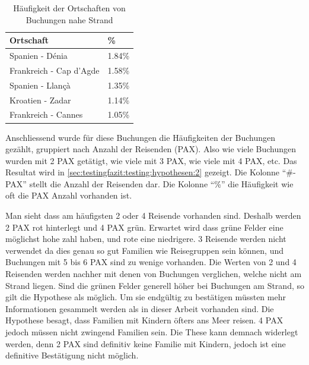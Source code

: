 \begin{table}[H] 
	\caption{Häufigkeit der Ortschaften von Buchungen nahe Strand}
	\centering
	\label{sec:testingfazit:testing:hypothesen:1}
	\begin{tabular}{ | l | l | } 
		\hline 
		\rowcolor{tableheadcolor}
		\bfseries Ortschaft & \bfseries \% \\ \hline 
		Spanien - Dénia & 1.84\% \\ \hline 
		Frankreich - Cap d'Agde & 1.58\% \\ \hline 
		Spanien - Llançà & 1.35\% \\ \hline 
		Kroatien - Zadar & 1.14\% \\ \hline 
		Frankreich - Cannes & 1.05\% \\ \hline 
	\end{tabular}
\end{table}

Anschliessend wurde für diese Buchungen die Häufigkeiten der Buchungen gezählt, gruppiert nach Anzahl der Reisenden (PAX). Also wie viele Buchungen wurden mit 2 PAX getätigt, wie viele mit 3 PAX, wie viele mit 4 PAX, etc. Das Resultat wird in \cref{sec:testingfazit:testing:hypothesen:2} gezeigt. Die Kolonne "`\#-PAX"' stellt die Anzahl der Reisenden dar. Die Kolonne "`\%"' die Häufigkeit wie oft die PAX Anzahl vorhanden ist.

Man sieht dass am häufigsten 2 oder 4 Reisende vorhanden sind. Deshalb werden 2 PAX rot hinterlegt und 4 PAX grün. Erwartet wird dass grüne Felder eine möglichst hohe zahl haben, und rote eine niedrigere. 3 Reisende werden nicht verwendet da dies genau so gut Familien wie Reisegruppen sein können, und Buchungen mit 5 bis 6 PAX sind zu wenige vorhanden. Die Werten von 2 und 4 Reisenden werden nachher mit denen von Buchungen verglichen, welche nicht am Strand liegen. Sind die grünen Felder generell höher bei Buchungen am Strand, so gilt die Hypothese als möglich. Um sie endgültig zu bestätigen müssten mehr Informationen gesammelt werden als in dieser Arbeit vorhanden sind. Die Hypothese besagt, dass Familien mit Kindern öfters ans Meer reisen. 4 PAX jedoch müssen nicht zwingend Familien sein. Die These kann demnach widerlegt werden, denn 2 PAX sind definitiv keine Familie mit Kindern, jedoch ist eine definitive Bestätigung nicht möglich. 

